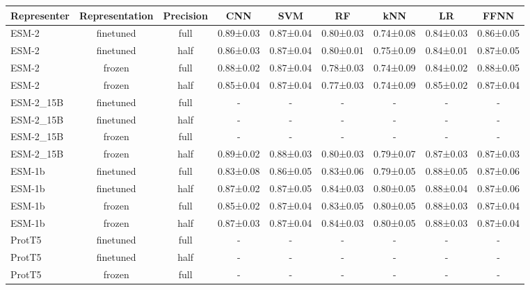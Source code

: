 \begin{tabular}{lcccccccc}
\toprule
 \textbf{Representer} & \textbf{Representation} & \textbf{Precision} &       \textbf{CNN} &       \textbf{SVM} &        \textbf{RF} &       \textbf{kNN} &        \textbf{LR} &      \textbf{FFNN} \\
\midrule
       ESM-2 &      finetuned &      full & 0.89±0.03 & 0.87±0.04 & 0.80±0.03 & 0.74±0.08 & 0.84±0.03 & 0.86±0.05 \\
       ESM-2 &      finetuned &      half & 0.86±0.03 & 0.87±0.04 & 0.80±0.01 & 0.75±0.09 & 0.84±0.01 & 0.87±0.05 \\
       ESM-2 &         frozen &      full & 0.88±0.02 & 0.87±0.04 & 0.78±0.03 & 0.74±0.09 & 0.84±0.02 & 0.88±0.05 \\
       ESM-2 &         frozen &      half & 0.85±0.04 & 0.87±0.04 & 0.77±0.03 & 0.74±0.09 & 0.85±0.02 & 0.87±0.04 \\
   ESM-2\_15B &      finetuned &      full &         - &         - &         - &         - &         - &         - \\
   ESM-2\_15B &      finetuned &      half &         - &         - &         - &         - &         - &         - \\
   ESM-2\_15B &         frozen &      full &         - &         - &         - &         - &         - &         - \\
   ESM-2\_15B &         frozen &      half & 0.89±0.02 & 0.88±0.03 & 0.80±0.03 & 0.79±0.07 & 0.87±0.03 & 0.87±0.03 \\
      ESM-1b &      finetuned &      full & 0.83±0.08 & 0.86±0.05 & 0.83±0.06 & 0.79±0.05 & 0.88±0.05 & 0.87±0.06 \\
      ESM-1b &      finetuned &      half & 0.87±0.02 & 0.87±0.05 & 0.84±0.03 & 0.80±0.05 & 0.88±0.04 & 0.87±0.06 \\
      ESM-1b &         frozen &      full & 0.85±0.02 & 0.87±0.04 & 0.83±0.05 & 0.80±0.05 & 0.88±0.03 & 0.87±0.04 \\
      ESM-1b &         frozen &      half & 0.87±0.03 & 0.87±0.04 & 0.84±0.03 & 0.80±0.05 & 0.88±0.03 & 0.87±0.04 \\
      ProtT5 &      finetuned &      full &         - &         - &         - &         - &         - &         - \\
      ProtT5 &      finetuned &      half &         - &         - &         - &         - &         - &         - \\
      ProtT5 &         frozen &      full &         - &         - &         - &         - &         - &         - \\

\end{tabular}
